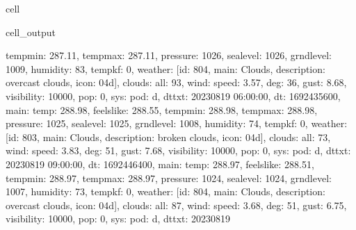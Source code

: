 \documentclass[letterpaper,10pt,english]{jupyterBook}
\begin{document}
\begin{sphinxuseclass}{cell}
\begin{sphinxVerbatimOutput}
\begin{sphinxuseclass}{cell_output}
\begin{sphinxVerbatim}[commandchars=\\\{\}]
\PYGZsq{}temp\PYGZus{}min\PYGZsq{}: 287.11, \PYGZsq{}temp\PYGZus{}max\PYGZsq{}: 287.11, \PYGZsq{}pressure\PYGZsq{}: 1026, \PYGZsq{}sea\PYGZus{}level\PYGZsq{}: 1026, \PYGZsq{}grnd\PYGZus{}level\PYGZsq{}: 1009, \PYGZsq{}humidity\PYGZsq{}: 83, \PYGZsq{}temp\PYGZus{}kf\PYGZsq{}: 0\PYGZcb{}, \PYGZsq{}weather\PYGZsq{}: [\PYGZob{}\PYGZsq{}id\PYGZsq{}: 804, \PYGZsq{}main\PYGZsq{}: \PYGZsq{}Clouds\PYGZsq{}, \PYGZsq{}description\PYGZsq{}: \PYGZsq{}overcast clouds\PYGZsq{}, \PYGZsq{}icon\PYGZsq{}: \PYGZsq{}04d\PYGZsq{}\PYGZcb{}], \PYGZsq{}clouds\PYGZsq{}: \PYGZob{}\PYGZsq{}all\PYGZsq{}: 93\PYGZcb{}, \PYGZsq{}wind\PYGZsq{}: \PYGZob{}\PYGZsq{}speed\PYGZsq{}: 3.57, \PYGZsq{}deg\PYGZsq{}: 36, \PYGZsq{}gust\PYGZsq{}: 8.68\PYGZcb{}, \PYGZsq{}visibility\PYGZsq{}: 10000, \PYGZsq{}pop\PYGZsq{}: 0, \PYGZsq{}sys\PYGZsq{}: \PYGZob{}\PYGZsq{}pod\PYGZsq{}: \PYGZsq{}d\PYGZsq{}\PYGZcb{}, \PYGZsq{}dt\PYGZus{}txt\PYGZsq{}: \PYGZsq{}2023\PYGZhy{}08\PYGZhy{}19 06:00:00\PYGZsq{}\PYGZcb{}, \PYGZob{}\PYGZsq{}dt\PYGZsq{}: 1692435600, \PYGZsq{}main\PYGZsq{}: \PYGZob{}\PYGZsq{}temp\PYGZsq{}: 288.98, \PYGZsq{}feels\PYGZus{}like\PYGZsq{}: 288.55, \PYGZsq{}temp\PYGZus{}min\PYGZsq{}: 288.98, \PYGZsq{}temp\PYGZus{}max\PYGZsq{}: 288.98, \PYGZsq{}pressure\PYGZsq{}: 1025, \PYGZsq{}sea\PYGZus{}level\PYGZsq{}: 1025, \PYGZsq{}grnd\PYGZus{}level\PYGZsq{}: 1008, \PYGZsq{}humidity\PYGZsq{}: 74, \PYGZsq{}temp\PYGZus{}kf\PYGZsq{}: 0\PYGZcb{}, \PYGZsq{}weather\PYGZsq{}: [\PYGZob{}\PYGZsq{}id\PYGZsq{}: 803, \PYGZsq{}main\PYGZsq{}: \PYGZsq{}Clouds\PYGZsq{}, \PYGZsq{}description\PYGZsq{}: \PYGZsq{}broken clouds\PYGZsq{}, \PYGZsq{}icon\PYGZsq{}: \PYGZsq{}04d\PYGZsq{}\PYGZcb{}], \PYGZsq{}clouds\PYGZsq{}: \PYGZob{}\PYGZsq{}all\PYGZsq{}: 73\PYGZcb{}, \PYGZsq{}wind\PYGZsq{}: \PYGZob{}\PYGZsq{}speed\PYGZsq{}: 3.83, \PYGZsq{}deg\PYGZsq{}: 51, \PYGZsq{}gust\PYGZsq{}: 7.68\PYGZcb{}, \PYGZsq{}visibility\PYGZsq{}: 10000, \PYGZsq{}pop\PYGZsq{}: 0, \PYGZsq{}sys\PYGZsq{}: \PYGZob{}\PYGZsq{}pod\PYGZsq{}: \PYGZsq{}d\PYGZsq{}\PYGZcb{}, \PYGZsq{}dt\PYGZus{}txt\PYGZsq{}: \PYGZsq{}2023\PYGZhy{}08\PYGZhy{}19 09:00:00\PYGZsq{}\PYGZcb{}, \PYGZob{}\PYGZsq{}dt\PYGZsq{}: 1692446400, \PYGZsq{}main\PYGZsq{}: \PYGZob{}\PYGZsq{}temp\PYGZsq{}: 288.97, \PYGZsq{}feels\PYGZus{}like\PYGZsq{}: 288.51, \PYGZsq{}temp\PYGZus{}min\PYGZsq{}: 288.97, \PYGZsq{}temp\PYGZus{}max\PYGZsq{}: 288.97, \PYGZsq{}pressure\PYGZsq{}: 1024, \PYGZsq{}sea\PYGZus{}level\PYGZsq{}: 1024, \PYGZsq{}grnd\PYGZus{}level\PYGZsq{}: 1007, \PYGZsq{}humidity\PYGZsq{}: 73, \PYGZsq{}temp\PYGZus{}kf\PYGZsq{}: 0\PYGZcb{}, \PYGZsq{}weather\PYGZsq{}: [\PYGZob{}\PYGZsq{}id\PYGZsq{}: 804, \PYGZsq{}main\PYGZsq{}: \PYGZsq{}Clouds\PYGZsq{}, \PYGZsq{}description\PYGZsq{}: \PYGZsq{}overcast clouds\PYGZsq{}, \PYGZsq{}icon\PYGZsq{}: \PYGZsq{}04d\PYGZsq{}\PYGZcb{}], \PYGZsq{}clouds\PYGZsq{}: \PYGZob{}\PYGZsq{}all\PYGZsq{}: 87\PYGZcb{}, \PYGZsq{}wind\PYGZsq{}: \PYGZob{}\PYGZsq{}speed\PYGZsq{}: 3.68, \PYGZsq{}deg\PYGZsq{}: 51, \PYGZsq{}gust\PYGZsq{}: 6.75\PYGZcb{}, \PYGZsq{}visibility\PYGZsq{}: 10000, \PYGZsq{}pop\PYGZsq{}: 0, \PYGZsq{}sys\PYGZsq{}: \PYGZob{}\PYGZsq{}pod\PYGZsq{}: \PYGZsq{}d\PYGZsq{}\PYGZcb{}, \PYGZsq{}dt\PYGZus{}txt\PYGZsq{}: \PYGZsq{}2023\PYGZhy{}08\PYGZhy{}19 
\end{sphinxVerbatim}
\end{sphinxuseclass}
\end{sphinxVerbatimOutput}
\end{sphinxuseclass}
\end{document}
